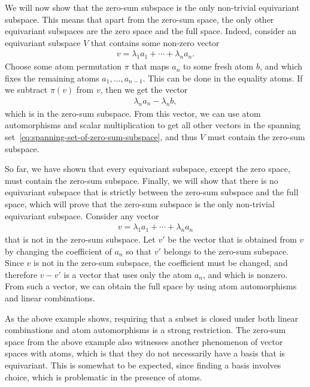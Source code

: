 \begin{myexample}
      We will now show that the zero-sum subspace is the only non-trivial equivariant subspace. This means that apart from the zero-sum space,  the only other equivariant subspaces are the zero space and the full space.  Indeed, consider an equivariant subspace $V$ that contains some non-zero vector 
        \begin{align*}
    v = \lambda_1 a_1 + \cdots + \lambda_n a_n.
    \end{align*}
    Choose some atom permutation $\pi$ that maps $a_n$ to some fresh atom $b$, and which fixes the remaining atoms $a_1,\ldots,a_{n-1}$. This can be done in the equality atoms.  If we subtract $\pi(v)$ from $v$, then we get the vector
    \begin{align*}
    \lambda_n a_n - \lambda_n b,
    \end{align*}
    which is in the zero-sum subspace. From this vector, we can use atom automorphisms and scalar multiplication to get all other  vectors in the spanning set~\eqref{eq:spanning-set-of-zero-sum-subspace}, and thus $V$ must contain the zero-sum subspace. 

    So far, we have shown that every equivariant subspace, except the zero
     space, must contain the zero-sum subspace. 
    Finally, we will show that there is no equivariant subspace that is strictly between the zero-sum subspace and the full space, which will prove  that the zero-sum subspace is the only non-trivial equivariant subspace. Consider any vector 
            \begin{align*}
    v = \lambda_1 a_1 + \cdots + \lambda_n a_n
    \end{align*}
    that is not in the zero-sum subspace. Let $v'$ be the vector that is obtained from $v$ by changing the coefficient of $a_n$ so that $v'$ belongs to the zero-sum subspace. Since $v$ is not in the zero-sum subspace, the coefficient must be changed, and therefore $v - v'$ is a vector that uses only the atom $a_n$, and which is nonzero. From such a vector, we can obtain the full space by using atom automorphisms and linear combinations.
\end{myexample} 



As the above example shows, requiring that a subset is closed under both linear combinations and atom automorphisms is a strong restriction. The zero-sum space from the above example also witnesses another phenomenon of vector spaces with atoms, which is that they do not necessarily have a basis that is equivariant.  This is somewhat to be expected, since finding a basis involves choice, which is problematic in the presence of atoms. 



